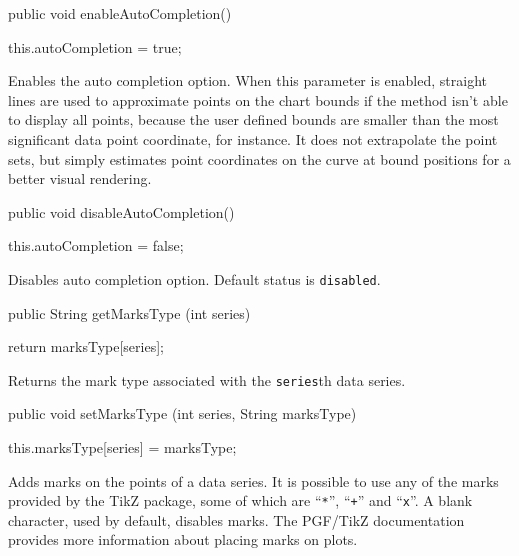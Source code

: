 \begin{code}

   public void enableAutoCompletion() \begin{hide} {
      this.autoCompletion = true;
   }\end{hide}
\end{code}
\begin{tabb}
   Enables the auto completion option. When this parameter
   is enabled, straight lines are used to approximate points on the
   chart bounds if the method isn't able to display all points,
   because the user defined bounds are smaller than the
   most significant data point coordinate, for instance.
   It does not extrapolate the point sets, but simply estimates
   point coordinates on the curve at bound positions for a better visual rendering.
\end{tabb}
\begin{code}

   public void disableAutoCompletion() \begin{hide} {
      this.autoCompletion = false;
   }\end{hide}
\end{code}
\begin{tabb}
   Disables auto completion option. Default status is \texttt{disabled}.
\end{tabb}
\begin{code}

   public String getMarksType (int series) \begin{hide} {
      return marksType[series];
   }\end{hide}
\end{code}
\begin{tabb}
   Returns the mark type associated with the \texttt{series}th data series.
\end{tabb}
\begin{htmlonly}
\end{htmlonly}
\begin{code}

   public void setMarksType (int series, String marksType) \begin{hide} {
      this.marksType[series] = marksType;
   }\end{hide}
\end{code}
\begin{tabb}
   Adds marks on the points of a data series.
   It is possible to use any of the marks provided by the TikZ package,
   some of which are ``\texttt{*}'', ``\texttt{+}'' and ``\texttt{x}''.
   A blank character, used by default, disables marks.
   The PGF/TikZ documentation provides more information about placing marks on plots.
\end{tabb}
